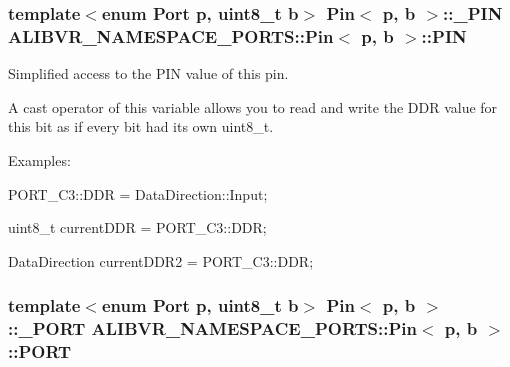 \subsubsection[{\texorpdfstring{P\+IN}{PIN}}]{\setlength{\rightskip}{0pt plus 5cm}template$<$enum Port p, uint8\+\_\+t b$>$ {\bf Pin}$<$ p, b $>$\+::{\bf \+\_\+\+P\+IN} {\bf A\+L\+I\+B\+V\+R\+\_\+\+N\+A\+M\+E\+S\+P\+A\+C\+E\+\_\+\+P\+O\+R\+T\+S\+::\+Pin}$<$ p, b $>$\+::P\+IN\hspace{0.3cm}{\ttfamily [static]}}\hypertarget{structALIBVR__NAMESPACE__PORTS_1_1Pin_a1db5d20ab305dba1701558e8fd2b94a7}{}\label{structALIBVR__NAMESPACE__PORTS_1_1Pin_a1db5d20ab305dba1701558e8fd2b94a7}


Simplified access to the P\+IN value of this pin. 

A cast operator of this variable allows you to read and write the D\+DR value for this bit as if every bit had its own uint8\+\_\+t.

Examples\+:


\begin{DoxyItemize}
\item {\ttfamily P\+O\+R\+T\+\_\+\+C3\+::\+D\+DR = Data\+Direction\+::\+Input;}
\item {\ttfamily uint8\+\_\+t current\+D\+DR = P\+O\+R\+T\+\_\+\+C3\+::\+D\+DR;}
\item {\ttfamily Data\+Direction current\+D\+D\+R2 = P\+O\+R\+T\+\_\+\+C3\+::\+D\+DR;} 
\end{DoxyItemize}
\subsubsection[{\texorpdfstring{P\+O\+RT}{PORT}}]{\setlength{\rightskip}{0pt plus 5cm}template$<$enum Port p, uint8\+\_\+t b$>$ {\bf Pin}$<$ p, b $>$\+::{\bf \+\_\+\+P\+O\+RT} {\bf A\+L\+I\+B\+V\+R\+\_\+\+N\+A\+M\+E\+S\+P\+A\+C\+E\+\_\+\+P\+O\+R\+T\+S\+::\+Pin}$<$ p, b $>$\+::P\+O\+RT\hspace{0.3cm}{\ttfamily [static]}}\hypertarget{structALIBVR__NAMESPACE__PORTS_1_1Pin_aaa60d0cc181d9170487e5429a3c63227}{}\label{structALIBVR__NAMESPACE__PORTS_1_1Pin_aaa60d0cc181d9170487e5429a3c63227}



